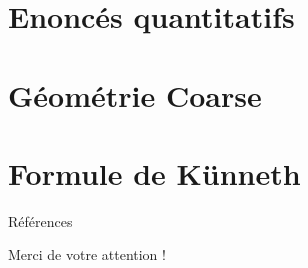 \documentclass{beamer}
\begin{document}
\section{Enoncés quantitatifs}
\begin{frame}
  \tableofcontents[currentsection]
\end{frame}


\section{Géométrie Coarse}
\begin{frame}
  \tableofcontents[currentsection]
\end{frame}


\section{Formule de Künneth}
\begin{frame}
  \tableofcontents[currentsection]
\end{frame}


\begin{frame}{Références}


\end{frame} 

\begin{frame}{}
Merci de votre attention !
\end{frame}
\end{document}
